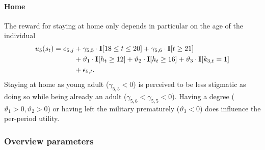 \FloatBarrier\paragraph*{Home}
The reward for staying at home only depends in particular on the age of the individual
%
\begin{align}
    u_5(s_t) =  e_{5,j} & + \gamma_{5,5} \cdot {\textbf{I}}[18 \leq t \leq 20] + \gamma_{5,6} \cdot {\textbf{I}}[t \geq 21] \nonumber \\
    							   & +\vartheta_{1} \cdot {\textbf{I}}[h_t \geq 12] + \vartheta_{2} \cdot {\textbf{I}}[h_t \geq 16] +  \vartheta_3 \cdot {\textbf{I}}[k_{3,t} = 1]  \nonumber \\
    							   & + \epsilon_{5,t}.
\end{align}
%
Staying at home as young adult ($\gamma_{5, 5} < 0$) is perceived to be less stigmatic as doing so while being already an adult ($\gamma_{5,6} < \gamma_{5, 5} <0$). Having a degree  ($\vartheta_1 > 0, \vartheta_2 > 0$) or having left the military prematurely  ($\vartheta_3 <0$) does influence the per-period utility.
\FloatBarrier\subsubsection*{Overview parameters}


